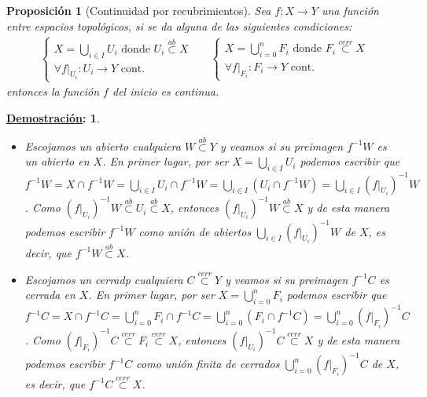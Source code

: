 \documentclass[10pt,a4paper,openright]{book}
\theoremstyle{break}
\newtheorem*{prop}{Proposición}
\newtheorem*{demo}{\underline{Demostración}:}
\begin{document}
\begin{prop}[Continuidad por recubrimientos]
Sea $f: X \rightarrow Y$ una función entre espacios topológicos, si se da alguna de las siguientes condiciones: 
\begin{align*}
\begin{cases}
X = \bigcup_{i \in  I} U_i \mbox{ donde } U_i \stackrel{ab}{\subset} X \\
\forall f|_{U_i} : U_i \rightarrow Y \mbox{ cont.}
\end{cases}
& &
\begin{cases}
X = \bigcup_{i =0}^n F_i \mbox{ donde } F_i \stackrel{cerr}{\subset} X \\
\forall f|_{F_i} : F_i \rightarrow Y \mbox{ cont.}
\end{cases}
\end{align*}
entonces la función $f$ del inicio es continua.
\end{prop}
\begin{demo}
	\begin{itemize}
	\item Escojamos un abierto cualquiera $W \stackrel{ab}{\subset} Y$ y veamos si su preimagen $f^{-1}W$ es un abierto en $X$. En primer lugar, por ser $X = \bigcup_{i \in  I} U_i$ podemos escribir que $f^{-1}W = X\cap f^{-1}W = \bigcup_{i \in  I} U_i \cap f^{-1} W = \bigcup_{i \in  I} \left( U_i \cap f^{-1} W\right) = \bigcup_{i \in  I} \left( f|_{U_i} \right)^{-1} W$. Como $\left( f|_{U_i} \right)^{-1}W \stackrel{ab}{\subset} U_i \stackrel{ab}{\subset} X$, entonces $\left( f|_{U_i} \right)^{-1} W \stackrel{ab}{\subset} X$ y de esta manera podemos escribir $f^{-1}W$ como unión de abiertos $\bigcup_{i \in  I} \left( f|_{U_i} \right)^{-1} W$ de $X$, es decir, que $f^{-1}W \stackrel{ab}{\subset} X$.
	
	\item Escojamos un cerradp cualquiera $C \stackrel{cerr}{\subset} Y$ y veamos si su preimagen $f^{-1}C$ es cerrada en $X$. En primer lugar, por ser $X = \bigcup_{i=0}^n F_i$ podemos escribir que $f^{-1}C = X\cap f^{-1}C = \bigcup_{i = 0}^n F_i \cap f^{-1} C = \bigcup_{i = 0}^n \left( F_i \cap f^{-1} C\right) = \bigcup_{i = 0}^n \left( f|_{F_i} \right)^{-1} C$. Como $\left( f|_{F_i} \right)^{-1}C \stackrel{cerr}{\subset} F_i \stackrel{cerr}{\subset} X$, entonces $\left( f|_{U_i} \right)^{-1} C \stackrel{cerr}{\subset} X$ y de esta manera podemos escribir $f^{-1}C$ como unión finita de cerrados $\bigcup_{i = 0}^n \left( f|_{F_i} \right)^{-1} C$ de $X$, es decir, que $f^{-1}C \stackrel{cerr}{\subset} X$.
    \end{itemize}
\end{demo}
\end{document}

